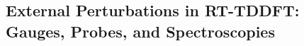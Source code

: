 %

\subsection{External Perturbations in RT-TDDFT: Gauges, Probes, and Spectroscopies}
\label{sec:em-interaction}

